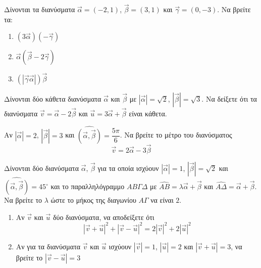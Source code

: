 \documentclass{../../presentation}
\begin{document}
\begin{askisi}
  Δίνονται τα διανύσματα $\vec{α}=(-2,1)$, $\vec{β}=(3,1)$ και $\vec{γ}=(0,-3)$. Να βρείτε τα:

  \begin{enumerate}
    \item<1-> $(3\vec{α})(-\vec{γ})$
    \item<2-> $\vec{α}(\vec{β}-2\vec{γ})$
    \item<3-> $(|\vec{γ}\vec{α}|)\vec{β}$
  \end{enumerate}


\end{askisi}

\begin{askisi}
  Δίνονται δύο κάθετα διανύσματα $\vec{α}$ και $\vec{β}$ με $|\vec{α}|=\sqrt{2}$, $|\vec{β}|=\sqrt{3}$. Να δείξετε ότι τα διανύσματα $\vec{v}=\vec{α}-2\vec{β}$ και $\vec{u}=3\vec{α}+\vec{β}$ είναι κάθετα.

\end{askisi}

\begin{askisi}
  Αν $|\vec{α}|=2$, $|\vec{β}|=3$ και $\widehat{(\vec{α }, \vec{β })}=\dfrac{5\pi}{6}$. Να βρείτε το μέτρο του διανύσματος
  $$\vec{v}=2\vec{α}-3\vec{β}$$

\end{askisi}

\begin{askisi}
  Δίνονται δύο διανύσματα $\vec{α}$, $\vec{β}$ για τα οποία ισχύουν $|\vec{α}|=1$, $|\vec{β}|=\sqrt{2}$ και $\widehat{(\vec{α }, \vec{β })}=45^{\circ}$ και το παραλληλόγραμμο $ΑΒΓΔ$ με $\widehat{ΑΒ}=λ\vec{α}+\vec{β}$ και $\widehat{ΑΔ}=\vec{α}+\vec{β}$. Να βρείτε το $λ$ ώστε το μήκος της διαγωνίου $ΑΓ$ να είναι $2$.

\end{askisi}

\begin{askisi}
  \begin{enumerate}
    \item<1-> Αν $\vec{v}$ και $\vec{u}$ δύο διανύσματα, να αποδείξετε ότι
          $$|\vec{v}+\vec{u}|^2+|\vec{v}-\vec{u}|^2=2|\vec{v}|^2+2|\vec{u}|^2$$
    \item<2-> Αν για τα διανύσματα $\vec{v}$ και $\vec{u}$ ισχύουν $|\vec{v}|=1$, $|\vec{u}|=2$ και $|\vec{v}+\vec{u}|=3$, να βρείτε το $|\vec{v}-\vec{u}|=3$
  \end{enumerate}

\end{askisi}
\end{document}
